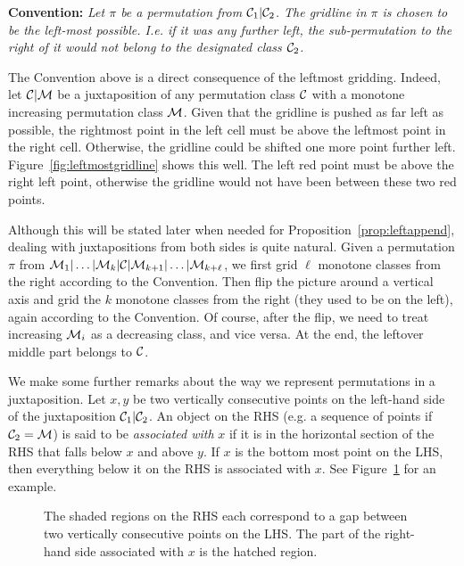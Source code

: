 \documentclass[12pt, a4paper, twoside]{report}
\begin{document}
\noindent\textbf{Convention:} \emph{Let $\pi$ be a permutation from $\mathcal{C}_1|\mathcal{C}_2$. The gridline in $\pi$ is chosen to be the left-most possible. I.e. if it was any further left, the sub-permutation to the right of it would not belong to the designated class $\mathcal{C}_2$.}

The Convention above is a direct consequence of the leftmost gridding. Indeed, let $\mathcal{C}|\mathcal{M}$ be a juxtaposition of any permutation class $\mathcal{C}$ with a monotone increasing permutation class $\mathcal{M}$. Given that the gridline is pushed as far left as possible, the rightmost point in the left cell must be above the leftmost point in the right cell. Otherwise, the gridline could be shifted one more point further left. Figure~\ref{fig:leftmostgridline} shows this well. The left red point must be above the right left point, otherwise the gridline would not have been between these two red points.

Although this will be stated later when needed for Proposition~\ref{prop:leftappend}, dealing with juxtapositions from both sides is quite natural. Given a permutation $\pi$ from $\mathcal{M}_1|\ldots|\mathcal{M}_k|\mathcal{C}|\mathcal{M}_{k+1}|\ldots|\mathcal{M}_{k+\ell}$, we first grid $\ell$ monotone classes from the right according to the Convention. Then flip the picture around a vertical axis and grid the $k$ monotone classes from the right (they used to be on the left), again according to the Convention. Of course, after the flip, we need to treat increasing $\mathcal{M}_i$ as a decreasing class, and vice versa. At the end, the leftover middle part belongs to $\mathcal{C}$. 

We make some further remarks about the way we represent permutations in a juxtaposition. Let $x,y$ be two vertically consecutive points on the left-hand side of the juxtaposition $\mathcal{C}_1|\mathcal{C}_2$. An object on the RHS (e.g. a sequence of points if $\mathcal{C}_2 = \mathcal{M}$) is said to be \emph{associated with} $x$ if it is in the horizontal section of the RHS that falls below $x$ and above $y$. If $x$ is the bottom most point on the LHS, then everything below it on the RHS is associated with $x$. See Figure~\ref{fig:xregion} for an example.
\begin{figure}[ht]
  \centering
  \caption{The shaded regions on the RHS each correspond to a gap between two vertically consecutive points on the LHS. The part of the right-hand side associated with $x$ is the hatched region.}
  \label{fig:xregion}
\end{figure}
\end{document}
